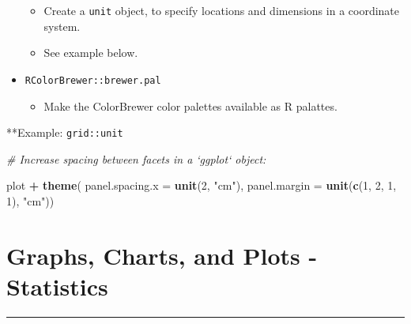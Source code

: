 \documentclass[
]{book}
\newenvironment{Shaded}{\begin{snugshade}}{\end{snugshade}}
\newcommand{\CommentTok}[1]{\textcolor[rgb]{0.56,0.35,0.01}{\textit{#1}}}
\newcommand{\DataTypeTok}[1]{\textcolor[rgb]{0.13,0.29,0.53}{#1}}
\newcommand{\DecValTok}[1]{\textcolor[rgb]{0.00,0.00,0.81}{#1}}
\newcommand{\KeywordTok}[1]{\textcolor[rgb]{0.13,0.29,0.53}{\textbf{#1}}}
\newcommand{\NormalTok}[1]{#1}
\newcommand{\OperatorTok}[1]{\textcolor[rgb]{0.81,0.36,0.00}{\textbf{#1}}}
\newcommand{\StringTok}[1]{\textcolor[rgb]{0.31,0.60,0.02}{#1}}
\providecommand{\tightlist}{%
  \setlength{\itemsep}{0pt}\setlength{\parskip}{0pt}}
\begin{document}
\begin{itemize}
  \begin{itemize}
  \tightlist
  \item
    Create a \texttt{unit} object, to specify locations and dimensions in a coordinate system.
  \item
    See example below.
  \end{itemize}
\item
  \texttt{RColorBrewer::brewer.pal}

  \begin{itemize}
  \tightlist
  \item
    Make the ColorBrewer color palettes available as R palattes.
  \end{itemize}
\end{itemize}

**Example: \texttt{grid::unit}

\begin{Shaded}
\begin{Highlighting}[]
\CommentTok{# Increase spacing between facets in a `ggplot` object:}

\NormalTok{plot }\OperatorTok{+}\StringTok{ }
\StringTok{  }\KeywordTok{theme}\NormalTok{(}
    \DataTypeTok{panel.spacing.x =} \KeywordTok{unit}\NormalTok{(}\DecValTok{2}\NormalTok{, }\StringTok{"cm"}\NormalTok{),}
    \DataTypeTok{panel.margin =} \KeywordTok{unit}\NormalTok{(}\KeywordTok{c}\NormalTok{(}\DecValTok{1}\NormalTok{, }\DecValTok{2}\NormalTok{, }\DecValTok{1}\NormalTok{, }\DecValTok{1}\NormalTok{), }\StringTok{"cm"}\NormalTok{))}
\end{Highlighting}
\end{Shaded}

\hypertarget{graphs-charts-and-plots---statistics}{%
\section{Graphs, Charts, and Plots - Statistics}\label{graphs-charts-and-plots---statistics}}

\begin{center}\rule{0.5\linewidth}{0.5pt}\end{center}
\end{document}
